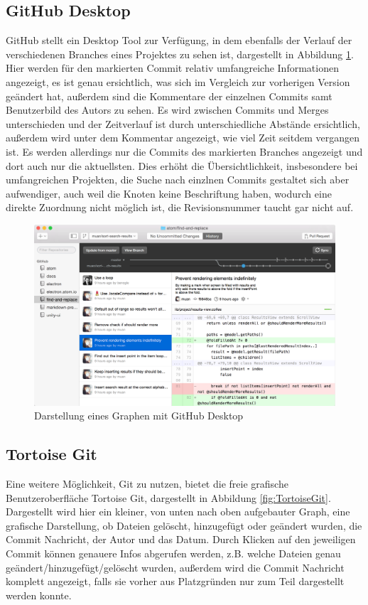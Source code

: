 \documentclass[nocolor]{tudbook}
\begin{document}
\subsection{GitHub Desktop}
GitHub stellt ein Desktop Tool zur Verfügung, in dem ebenfalls der Verlauf der verschiedenen Branches eines Projektes zu sehen ist, dargestellt in Abbildung \ref{fig:GitHubDesktop}. Hier werden für den markierten Commit relativ umfangreiche Informationen angezeigt, es ist genau ersichtlich, was sich im Vergleich zur vorherigen Version geändert hat, außerdem sind die Kommentare der einzelnen Commits samt Benutzerbild des Autors zu sehen. Es wird zwischen Commits und Merges unterschieden und der Zeitverlauf ist durch unterschiedliche Abstände ersichtlich, außerdem wird unter dem Kommentar angezeigt, wie viel Zeit seitdem vergangen ist. Es werden allerdings nur die Commits des markierten Branches angezeigt und dort auch nur die aktuellsten. Dies erhöht die Übersichtlichkeit, insbesondere bei umfangreichen Projekten, die Suche nach einzlnen Commits gestaltet sich aber aufwendiger, auch weil die Knoten keine Beschriftung haben, wodurch eine direkte Zuordnung nicht möglich ist, die Revisionsnummer taucht gar nicht auf.

\begin{figure}[htb] 
  \centering
     \includegraphics[width=\textwidth]{GitHubDesktop.png}
  \caption[Darstellung eines Graphen mit GitHub Dekstop, entnommen von \GitHubDesktop, abgerufen am 24.11.2015]{Darstellung eines Graphen mit GitHub Desktop}
  \label{fig:GitHubDesktop}
\end{figure}

\subsection{Tortoise Git}
Eine weitere Möglichkeit, Git zu nutzen, bietet die freie grafische Benutzeroberfläche Tortoise Git, dargestellt in Abbildung \ref{fig:TortoiseGit}. Dargestellt wird hier ein kleiner, von unten nach oben aufgebauter Graph, eine grafische Darstellung, ob Dateien gelöscht, hinzugefügt oder geändert wurden, die Commit Nachricht, der Autor und das Datum. Durch Klicken auf den jeweiligen Commit können genauere Infos abgerufen werden, z.B. welche Dateien genau geändert/hinzugefügt/gelöscht wurden, außerdem wird die Commit Nachricht komplett angezeigt, falls sie vorher aus Platzgründen nur zum Teil dargestellt werden konnte.
\end{document}
